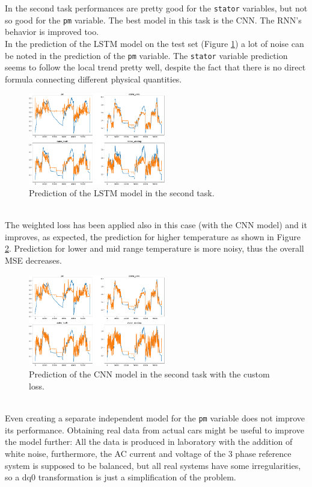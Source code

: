 In the second task performances are pretty good for the \verb|stator| variables, but not so good for the \verb|pm| variable. The best model in this task is the CNN. The RNN's behavior is improved too.\\
In the prediction of the LSTM model on the test set (Figure \ref{fig:lstm_second}) a lot of noise can be noted in the prediction of the \verb|pm| variable.
The \verb|stator| variable prediction seems to follow the local trend pretty well, despite the fact that there is no direct formula connecting different physical quantities.
\begin{figure}[!h]
    \centering
    \includegraphics[width=\linewidth, height=4cm]{imgs/lstm_pred_second.png}
    \caption{Prediction of the LSTM model in the second task.}
    \label{fig:lstm_second}
\end{figure}\\

The weighted loss has been applied also in this case (with the CNN model) and it improves, as expected, the prediction for higher temperature as shown in Figure \ref{fig:cnn_second}. Prediction for lower and mid range temperature is more noisy, thus the overall MSE decreases.
\begin{figure}[!h]
    \centering
    \includegraphics[width=\linewidth, height=4cm]{imgs/pred_second_custom_loss.png}
    \caption{Prediction of the CNN model in the second task with the custom loss.}
    \label{fig:cnn_second}
\end{figure}\\

Even creating a separate independent model for the \verb|pm| variable does not improve its performance.
Obtaining real data from actual cars might be useful to improve the model further: 
All the data is produced in laboratory with the addition of white noise, furthermore, the AC current and voltage of the 3 phase reference system is supposed to be balanced, but all real systems have some irregularities, so a dq0 transformation is just a simplification of the problem.

